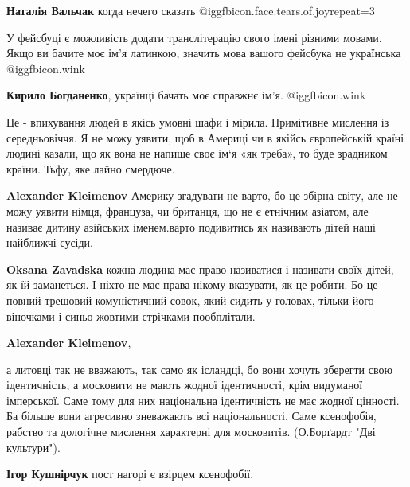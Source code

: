 \begin{itemize}
\begin{itemize}
\textbf{Наталія Вальчак} когда нечего сказать @igg{fbicon.face.tears.of.joy}{repeat=3} 


\end{itemize} %


У фейсбуці є можливість додати транслітерацію свого імені різними мовами. Якщо
ви бачите моє ім'я латинкою, значить мова вашого фейсбука не українська  @igg{fbicon.wink} 

\begin{itemize} %
\textbf{Кирило Богданенко}, українці бачать моє справжнє ім'я. @igg{fbicon.wink} 
\end{itemize} %


Це - впихування людей в якісь умовні шафи і мірила. Примітивне мислення із
середньовіччя. Я не можу уявити, щоб в Америці чи в якійсь європейській країні
людині казали, що як вона не напише своє ім‘я «як треба», то буде зрадником
країни. Тьфу, яке лайно смердюче.

\begin{itemize} %
\textbf{Alexander Kleimenov} Америку згадувати не варто, бо це збірна світу, але не можу уявити німця, француза, чи британця, що не є етнічним азіатом, але називає дитину азійських іменем.варто подивитись як називають дітей наші найближчі сусіди.

\textbf{Oksana Zavadska} кожна людина має право називатися і називати своїх дітей, як їй заманеться. І ніхто не має права нікому вказувати, як це робити. Бо це - повний трешовий комуністичний совок, який сидить у головах, тільки його віночками і синьо-жовтими стрічками пообплітали.

\textbf{Alexander Kleimenov}, 

а литовці так не вважають, так само як ісландці, бо вони хочуть зберегти свою
ідентичність, а московити не мають жодної ідентичності, крім видуманої
імперської. Саме тому для них національна ідентичність не має жодної цінності.
Ба більше вони агресивно зневажають всі національності. Саме ксенофобія,
рабство та дологічне мислення характерні для московитів. (О.Борґардт "Дві
культури").

\textbf{Ігор Кушнірчук} пост нагорі є взірцем ксенофобії.


\end{itemize}
\end{itemize}

